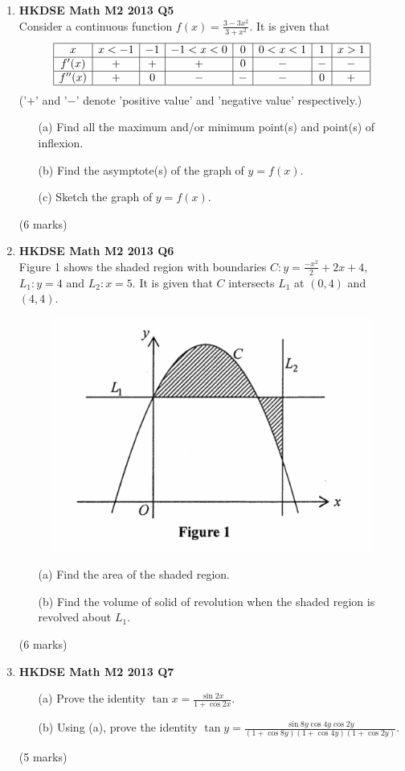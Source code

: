 \documentclass[12pt]{article}
\begin{document}
\begin{enumerate}
	\item \textbf{HKDSE Math M2 2013 Q5}\\
	Consider a continuous function $f(x) = \displaystyle\frac{3 -3x^2}{3+x^2}$. It is given that $$\begin{array}{|c|c|c|c|c|c|c|c|}
		\hline
		x & x<-1 & -1 & -1<x<0 & 0 & 0<x<1 & 1 & x>1\\
		\hline
		f'(x) & + & + & + & 0 & - & - & -\\
		\hline		
		f''(x) & + & 0 & - & - & - & 0 & +\\
		\hline
    \end{array}$$
	('$+$' and '$-$' denote 'positive value' and 'negative value' respectively.)
	\begin{enumerate}
		\item [(a)]Find all the maximum and/or minimum point(s) and point(s) of inflexion.
		\item [(b)]Find the asymptote(s) of the graph of $y = f(x)$. 
		\item [(c)]Sketch the graph of $y = f(x)$.
	\end{enumerate}
	(6 marks)

	\item \textbf{HKDSE Math M2 2013 Q6}\\
	Figure 1 shows the shaded region with boundaries $C : y = \displaystyle\frac{-x^2}{2} + 2x + 4$, $L_1 : y = 4$ and $L_2 : x = 5$. It is given that $C$ intersects $L_1$ at $(0,4)$ and $(4,4)$. 
	\begin{figure}[H]
		\centering
		\includegraphics[width = .5\linewidth]{2013Figure1}
	\end{figure}
	\begin{enumerate}
		\item [(a)]Find the area of the shaded region.
		\item [(b)]Find the volume of solid of revolution when the shaded region is revolved about $L_1$.
	\end{enumerate}
	(6 marks)

	\item \textbf{HKDSE Math M2 2013 Q7}
	\begin{enumerate}
		\item [(a)]Prove the identity $\tan{x} = \displaystyle\frac{\sin{2x}}{1+\cos{2x}}$. 
		\item [(b)]Using (a), prove the identity $\tan{y} = \displaystyle\frac{\sin{8y}\cos{4y}\cos{2y}}{(1+\cos{8y})(1+\cos{4y})(1+\cos{2y})}$.
	\end{enumerate}
	(5 marks)


\end{enumerate}
\end{document}
